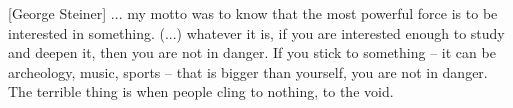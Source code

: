 

\begin{ntquote}

[George Steiner]{%
  ... my motto was to know that the most powerful force is to be interested in something.
  (...) whatever it is, if you are interested enough to study and deepen it, then you are not in danger.
  If you stick to something -- it can be archeology, music, sports -- that is bigger than yourself,
  you are not in danger. The terrible thing is when people cling to nothing, to the void.
}

\end{ntquote}